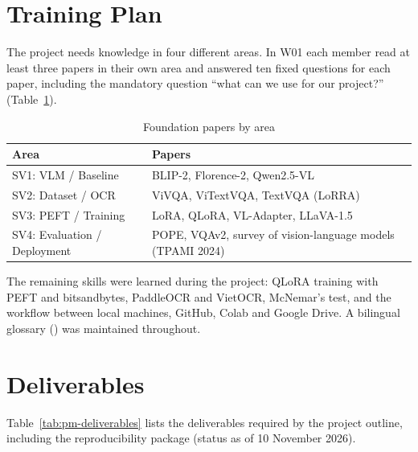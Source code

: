 \section{Training Plan}

The project needs knowledge in four different areas. In W01 each member read at
least three papers in their own area and answered ten fixed questions for each
paper, including the mandatory question ``what can we use for our project?''
(Table~\ref{tab:pm-papers}).

\begin{table}[htbp]
\caption{Foundation papers by area}
\label{tab:pm-papers}
\centering
\small
\begin{tabular}{p{}p{}}
\toprule
\textbf{Area} & \textbf{Papers} \\
\midrule
SV1: VLM / Baseline & BLIP-2, Florence-2, Qwen2.5-VL \\
SV2: Dataset / OCR & ViVQA, ViTextVQA, TextVQA (LoRRA) \\
SV3: PEFT / Training & LoRA, QLoRA, VL-Adapter, LLaVA-1.5 \\
SV4: Evaluation / Deployment & POPE, VQAv2, survey of vision-language models (TPAMI 2024) \\
\bottomrule
\end{tabular}
\end{table}

The remaining skills were learned during the project: QLoRA training with PEFT
and bitsandbytes, PaddleOCR and VietOCR, McNemar's test, and the workflow between
local machines, GitHub, Colab and Google Drive. A bilingual glossary
() was maintained throughout.

\section{Deliverables}

Table~\ref{tab:pm-deliverables} lists the deliverables required by the project
outline, including the reproducibility package (status as of 10 November 2026).

